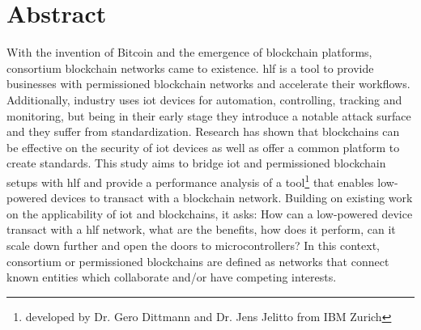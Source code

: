 \chapter*{Abstract}






With the invention of Bitcoin and the emergence of blockchain platforms, consortium blockchain networks came to existence. \acrlong{hlf} is a tool to provide businesses with permissioned blockchain networks and accelerate their workflows. Additionally, industry  uses \acrlong{iot} devices for automation, controlling, tracking and monitoring, but being in their early stage they introduce a notable attack surface \cite{secure-IoT} and they suffer from standardization. Research has shown that blockchains can be effective on the security of \acrshort{iot} devices as well as offer a common platform to create standards. This study aims to bridge \acrshort{iot} and permissioned blockchain setups with \acrlong{hlf} and provide a performance analysis of a tool\footnote{developed by Dr. Gero Dittmann \cite{gero} and Dr. Jens Jelitto \cite{jens} from IBM Zurich} that enables low-powered devices to transact with a blockchain network. Building on existing work on the applicability of \acrshort{iot} and blockchains, it asks: How can a low-powered device transact with a \acrlong{hlf} network, what are the benefits, how does it perform, can it scale down further and open the doors to microcontrollers? In this context, consortium or permissioned blockchains are defined as networks that connect known entities which collaborate and/or have competing interests.

